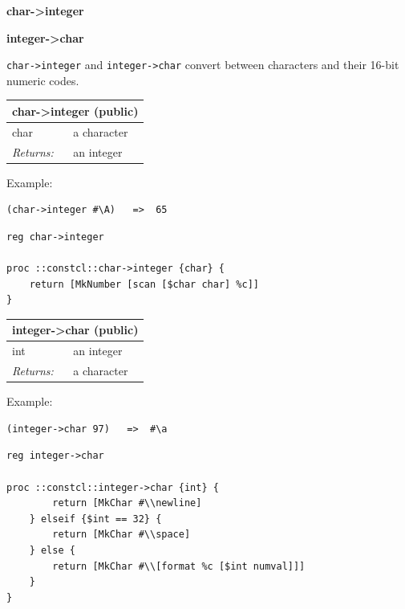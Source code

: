\documentclass[twoside,9pt]{report}
\begin{document}
\textbf{char->integer}


\textbf{integer->char}


\texttt{char->integer} and \texttt{integer->char} convert between characters and their 16-bit numeric codes.

\begin{tabular}{ |l l| }
\hline
\multicolumn{2}{|l|}{char->integer (public)} \\
\hline
char & a character \\
\textit{Returns:} & an integer \\
\hline
\end{tabular}


Example:

\noindent\makebox[\linewidth]{\rule{\linewidth}{0.4pt}}
\begin{lstlisting}
(char->integer #\A)   =>  65
\end{lstlisting}
\noindent\makebox[\linewidth]{\rule{\linewidth}{0.4pt}}
\noindent\makebox[\linewidth]{\rule{\linewidth}{0.4pt}}
\begin{lstlisting}
reg char->integer
 
proc ::constcl::char->integer {char} {
    return [MkNumber [scan [$char char] %c]]
}
\end{lstlisting}
\noindent\makebox[\linewidth]{\rule{\linewidth}{0.4pt}}
\begin{tabular}{ |l l| }
\hline
\multicolumn{2}{|l|}{integer->char (public)} \\
\hline
int & an integer \\
\textit{Returns:} & a character \\
\hline
\end{tabular}


Example:

\noindent\makebox[\linewidth]{\rule{\linewidth}{0.4pt}}
\begin{lstlisting}
(integer->char 97)   =>  #\a
\end{lstlisting}
\noindent\makebox[\linewidth]{\rule{\linewidth}{0.4pt}}
\noindent\makebox[\linewidth]{\rule{\linewidth}{0.4pt}}
\begin{lstlisting}
reg integer->char
 
proc ::constcl::integer->char {int} {
        return [MkChar #\\newline]
    } elseif {$int == 32} {
        return [MkChar #\\space]
    } else {
        return [MkChar #\\[format %c [$int numval]]]
    }
}
\end{lstlisting}
\noindent\makebox[\linewidth]{\rule{\linewidth}{0.4pt}}
\end{document}
